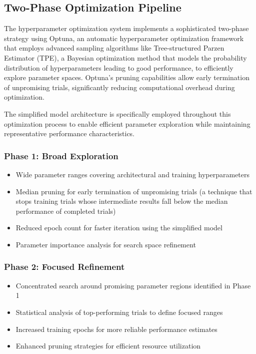\documentclass[a4paper]{usiinfbachelorproject}
\begin{document}
\subsection{Two-Phase Optimization Pipeline}

The hyperparameter optimization system implements a sophisticated two-phase strategy using Optuna, an automatic hyperparameter optimization framework that employs advanced sampling algorithms like Tree-structured Parzen Estimator (TPE), a Bayesian optimization method that models the probability distribution of hyperparameters leading to good performance, to efficiently explore parameter spaces. Optuna's pruning capabilities allow early termination of unpromising trials, significantly reducing computational overhead during optimization.

The simplified model architecture is specifically employed throughout this optimization process to enable efficient parameter exploration while maintaining representative performance characteristics.

\subsubsection{Phase 1: Broad Exploration}
\begin{itemize}
    \item Wide parameter ranges covering architectural and training hyperparameters
    \item Median pruning for early termination of unpromising trials (a technique that stops training trials whose intermediate results fall below the median performance of completed trials)
    \item Reduced epoch count for faster iteration using the simplified model
    \item Parameter importance analysis for search space refinement
\end{itemize}

\subsubsection{Phase 2: Focused Refinement}
\begin{itemize}
    \item Concentrated search around promising parameter regions identified in Phase 1
    \item Statistical analysis of top-performing trials to define focused ranges
    \item Increased training epochs for more reliable performance estimates
    \item Enhanced pruning strategies for efficient resource utilization
\end{itemize}
\end{document}
